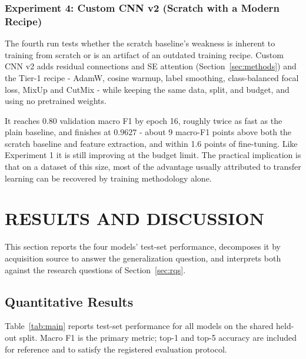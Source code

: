 \documentclass[12pt,a4paper]{article}
\begin{document}
\subsubsection{Experiment 4: Custom CNN v2 (Scratch with a Modern Recipe)}
The fourth run tests whether the scratch baseline's weakness is inherent to training from scratch or is an artifact of an outdated training recipe. Custom CNN v2 adds residual connections and SE attention (Section~\ref{sec:methods}) and the Tier-1 recipe - AdamW, cosine warmup, label smoothing, class-balanced focal loss, MixUp and CutMix - while keeping the same data, split, and budget, and using no pretrained weights.

It reaches $0.80$ validation macro F1 by epoch 16, roughly twice as fast as the plain baseline, and finishes at $0.9627$ - about 9 macro-F1 points above both the scratch baseline and feature extraction, and within 1.6 points of fine-tuning. Like Experiment 1 it is still improving at the budget limit. The practical implication is that on a dataset of this size, most of the advantage usually attributed to transfer learning can be recovered by training methodology alone.

\section{RESULTS AND DISCUSSION}
\label{sec:results}
This section reports the four models' test-set performance, decomposes it by acquisition source to answer the generalization question, and interprets both against the research questions of Section~\ref{sec:rqs}.

\subsection{Quantitative Results}
Table~\ref{tab:main} reports test-set performance for all models on the shared held-out split. Macro F1 is the primary metric; top-1 and top-5 accuracy are included for reference and to satisfy the registered evaluation protocol.
\end{document}
